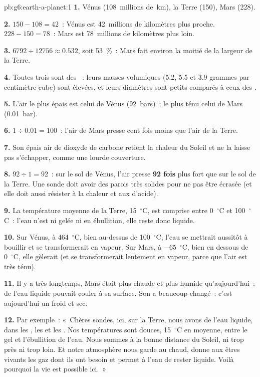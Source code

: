 \begin{solution}{pb:g6:earth-a-planet:1}
\textbf{1.} Vénus (108~millions de~km), la Terre (150), Mars (228).

\textbf{2.} $150 - 108 = 42$~: Vénus est 42~millions de kilomètres plus
proche. $228 - 150 = 78$~: Mars est 78~millions de kilomètres plus loin.

\textbf{3.} $6792 \div 12756 \approx 0.532$, soit 53~\%~: Mars fait environ
la moitié de la largeur de la Terre.

\textbf{4.} Toutes trois sont des ~: leurs masses
volumiques (5.2, 5.5 et 3.9 grammes par centimètre cube) sont élevées, et
leurs diamètres sont petits comparés à ceux des .

\textbf{5.} L'air le plus épais est celui de Vénus (92~bars)~; le plus ténu
celui de Mars (0.01~bar).

\textbf{6.} $1 \div 0.01 = 100$~: l'air de Mars presse cent fois moins que
l'air de la Terre.

\textbf{7.} Son épais air de dioxyde de carbone retient la chaleur du Soleil
et ne la laisse pas s'échapper, comme une lourde couverture.

\textbf{8.} $92 \div 1 = 92$~: sur le sol de Vénus, l'air presse
\textbf{92 fois} plus fort que sur le sol de la Terre. Une sonde doit avoir
des parois très solides pour ne pas être écrasée (et elle doit aussi
résister à la chaleur et aux  d'acide).

\textbf{9.} La température moyenne de la Terre, 15~$^\circ$C, est comprise
entre 0~$^\circ$C et 100~$^\circ$C~: l'eau n'est ni gelée ni en
ébullition, elle reste donc liquide.

\textbf{10.} Sur Vénus, à 464~$^\circ$C, bien au-dessus de 100~$^\circ$C,
l'eau se mettrait aussitôt à bouillir et se transformerait en vapeur. Sur
Mars, à $-65$~$^\circ$C, bien en dessous de 0~$^\circ$C, elle gèlerait
(et se transformerait lentement en vapeur, parce que l'air est très ténu).

\textbf{11.} Il y a très longtemps, Mars était plus chaude et plus humide
qu'aujourd'hui~: de l'eau liquide pouvait couler à sa surface. Son  a
beaucoup changé~: c'est aujourd'hui un  froid et sec.

\textbf{12.} Par exemple~: «~Chères sondes, ici, sur la Terre, nous avons
de l'eau liquide, dans les , les  et les . Nos
températures sont douces, 15~$^\circ$C en moyenne, entre le gel et
l'ébullition de l'eau. Nous sommes à la bonne distance du Soleil, ni trop
près ni trop loin. Et notre atmosphère nous garde au chaud, donne aux êtres
vivants les gaz dont ils ont besoin et permet à l'eau de rester liquide.
Voilà pourquoi la vie est possible ici.~»
\end{solution}
